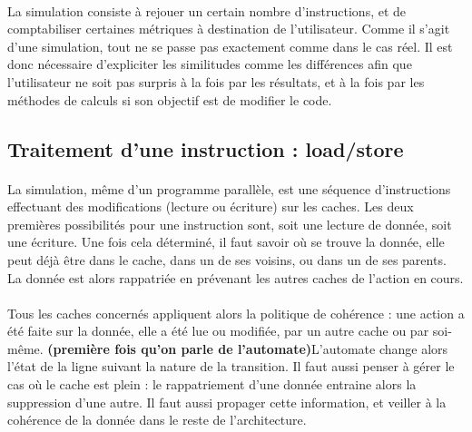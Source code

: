 \paragraph{}
La simulation consiste à rejouer un certain nombre d'instructions, et de comptabiliser certaines métriques à destination de l'utilisateur. Comme il s'agit d'une simulation, tout ne se passe pas exactement comme dans le cas réel. Il est donc nécessaire d'expliciter les similitudes comme les différences afin que l'utilisateur ne soit pas surpris à la fois par les résultats, et à la fois par les méthodes de calculs si son objectif est de modifier le code.

\subsection{Traitement d'une instruction : load/store}

\paragraph{}
La simulation, même d'un programme parallèle, est une séquence d'instructions effectuant des modifications (lecture ou écriture) sur les caches. Les deux premières possibilités pour une instruction sont, soit une lecture de donnée, soit une écriture. Une fois cela déterminé, il faut savoir où se trouve la donnée, elle peut déjà être dans le cache, dans un de ses voisins, ou dans un de ses parents. La donnée est alors rappatriée en prévenant les autres caches de l'action en cours. 

\paragraph{}
Tous les caches concernés appliquent alors la politique de cohérence : une action a été faite sur la donnée, elle a été lue ou modifiée, par un autre cache ou par soi-même. \textbf{(première fois qu'on parle de l'automate)}L'automate change alors l'état de la ligne suivant la nature de la transition. Il faut aussi penser à gérer le cas où le cache est plein : le rappatriement d'une donnée entraine alors la suppression d'une autre. Il faut aussi propager cette information, et veiller à la cohérence de la donnée dans le reste de l'architecture.

